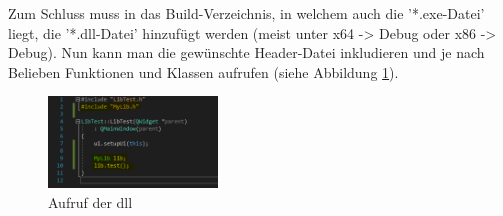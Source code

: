 Zum Schluss muss in das Build-Verzeichnis, in welchem auch die '*.exe-Datei' liegt, die '*.dll-Datei' hinzufügt werden (meist unter x64 -> Debug oder x86 -> Debug). Nun kann man die gewünschte Header-Datei inkludieren und je nach Belieben Funktionen und Klassen aufrufen (siehe Abbildung \ref{fig:Final2}).
\begin{figure}[H]
	\centering
	\includegraphics[width=0.40\textwidth]{figures/vsFinal.png}
	\caption{Aufruf der dll}
	\label{fig:Final2}
\end{figure}
\newpage